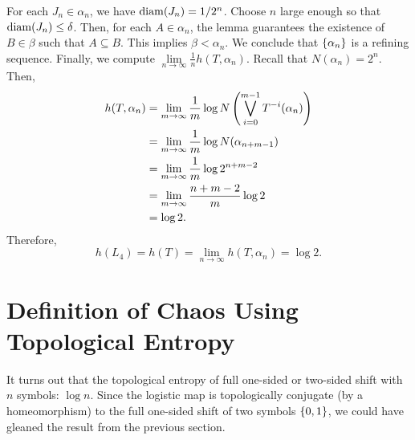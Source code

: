 \documentclass[12pt,twoside,draft]{book}
\begin{document}
For each $J_n \in \alpha_n$, we have $\mathrm{diam}(J_n) = 1/{2^n}$.
Choose $n$ large enough so that $\mathrm{diam}(J_n) \leq \delta$.
Then, for each $A \in \alpha_n$, the lemma guarantees the existence of $B \in \beta$ such that $A \subseteq B$.
This implies $\beta < \alpha_n$.
We conclude that $\left \{ \alpha_n \right \}$ is a refining sequence.
Finally, we compute $\lim\limits_{n \to \infty} \frac{1}{n} h(T, \alpha_n)$.
Recall that $N(\alpha_{n}) = 2^n$.
Then,
\begin{align*}
  h(T, \alpha_n)
  &= \lim\limits_{m \to \infty} \frac{1}{m} \log N\left (  \bigvee\limits_{i = 0}^{m-1} T^{-i}(\alpha_n) \right )  \\
  &= \lim\limits_{m \to \infty} \frac{1}{m} \log N(\alpha_{n+m-1})  \\
  &= \lim\limits_{m \to \infty} \frac{1}{m} \log 2^{n + m - 2}  \\
  &= \lim\limits_{m \to \infty} \frac{n + m - 2}{m} \log 2 \\
  &= \log 2.
\end{align*}
Therefore,
\begin{equation*}
  h(L_4) = h(T) = \lim\limits_{n \to \infty} h(T, \alpha_n) = \log 2.
\end{equation*}

\section{Definition of Chaos Using Topological Entropy}
It turns out that the topological entropy of full one-sided or two-sided shift with $n$ symbols: $\log n$. \citep[p.177]{walters}
Since the logistic map is topologically conjugate (by a homeomorphism) to the full one-sided shift of two symbols $\left \{ 0,1 \right \}$, we could have gleaned the result from the previous section.
\end{document}
